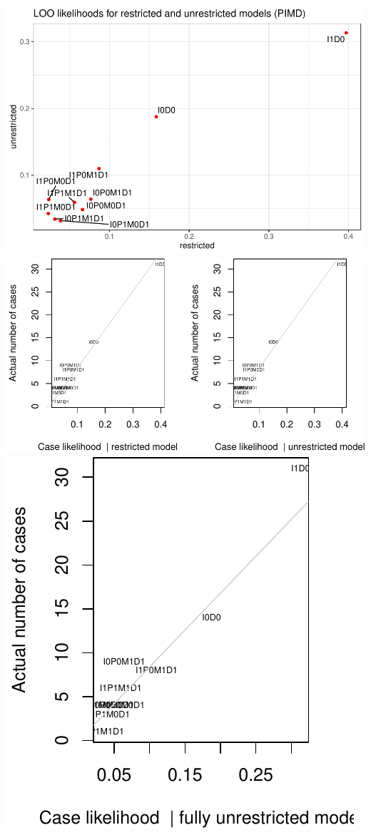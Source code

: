 \documentclass[
  12pt,
]{book}
\begin{document}
\includegraphics{ii_files/figure-latex/loo_pimdplots-1.pdf} \includegraphics{ii_files/figure-latex/loo_pimdplots-2.pdf} \includegraphics{ii_files/figure-latex/loo_pimdplots-3.pdf}
\end{document}
